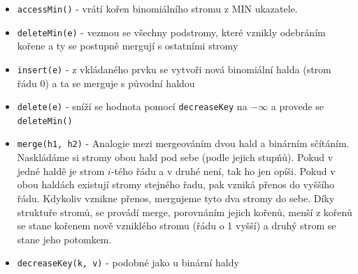 \begin{itemize}[itemsep=0pt, topsep=2pt]
    \item \texttt{accessMin()} - vrátí kořen binomiálního stromu z MIN ukazatele.
    \item \texttt{deleteMin(e)} - vezmou se všechny podstromy, které vznikly odebráním kořene a ty se postupně mergují s ostatními stromy
    \item \texttt{insert(e)} - z vkládaného prvku se vytvoři nová binomiální halda (strom řádu 0) a ta se merguje s původní haldou
    \item \texttt{delete(e)} - sníží se hodnota pomocí \texttt{decreaseKey} na $-\infty$ a provede se \texttt{deleteMin()}
    \item \texttt{merge(h1, h2)} - Analogie mezi mergeováním dvou hald a binárním sčítáním. Naskládáme si stromy obou hald pod sebe (podle jejich stupňů). Pokud v jedné haldě je strom $i$-tého řádu a v druhé není, tak ho jen opíši. Pokud v obou haldách existují stromy stejného řadu, pak vzniká přenos do vyššího řádu. Kdykoliv vznikne přenos, mergujeme tyto dva stromy do sebe. Díky struktuře stromů, se provádí merge, porovnáním jejich kořenů, menší z kořenů se stane kořenem nově vzniklého stromu (řádu o 1 vyšší) a druhý strom se stane jeho potomkem.
    \item \texttt{decreaseKey(k, v)} - podobné jako u binární haldy
\end{itemize}

